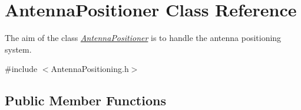 \hypertarget{classAntennaPositioner}{}\section{Antenna\+Positioner Class Reference}
\label{classAntennaPositioner}


The aim of the class {\itshape \hyperlink{classAntennaPositioner}{Antenna\+Positioner}} is to handle the antenna positioning system.  




{\ttfamily \#include $<$Antenna\+Positioning.\+h$>$}

\subsection*{Public Member Functions}
